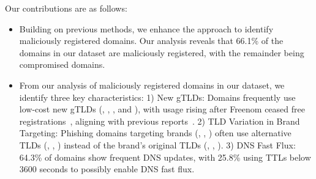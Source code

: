 Our contributions are as follows:
\begin{itemize}[leftmargin=*, topsep=0pt, itemsep=0em]
\item Building on previous methods, we enhance the approach to identify maliciously registered domains. Our analysis reveals that 66.1\% of the domains in our dataset are maliciously registered, with the remainder being compromised domains.

\item From our analysis of maliciously registered domains in our dataset, we identify three key characteristics:
1) New gTLDs: Domains frequently use low-cost new gTLDs (\eg, , , and ), with  usage rising after Freenom ceased free registrations~\cite{SuedbyMe25:online}, aligning with previous reports~\cite{Phishing18:online}.
2) TLD Variation in Brand Targeting: Phishing domains targeting brands (\eg, , ) often use alternative TLDs (\eg, , ) instead of the brand’s original TLDs (\eg, , ).
% 
3) DNS Fast Flux: 64.3\% of domains show frequent DNS updates, with 25.8\% using TTLs below 3600 seconds to possibly enable DNS fast flux.
% 


\end{itemize}
